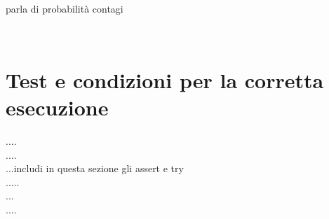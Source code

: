 \documentclass[a4paper,10 pt]{article}
\begin{document}
\ \\ parla di probabilità contagi

\begin{figure}
\centering
{} \quad {} \\
\caption{}
\label{fig:subfig}
\end{figure}

\section{Test e condizioni per la corretta esecuzione}
....
\ \\
....
\ \\
...includi in questa sezione gli assert e try 
\ \\
.....
\ \\
...
\ \\
....
\end{document}
